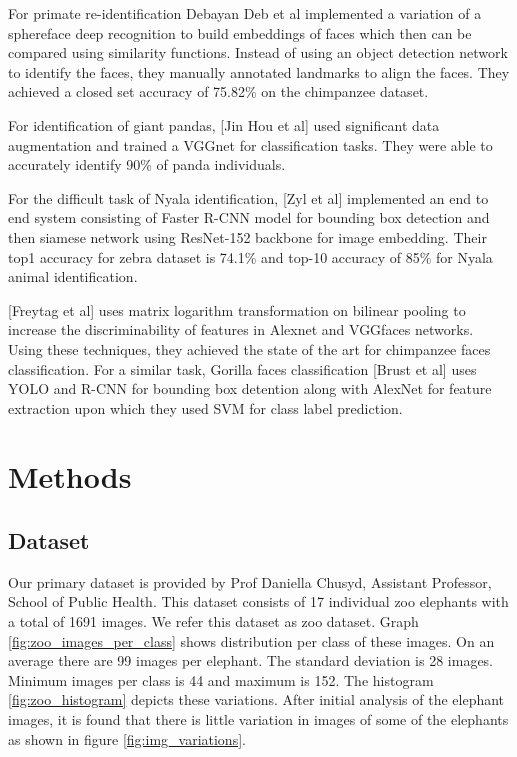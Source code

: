 \documentclass[10pt,twocolumn,letterpaper]{article}
\begin{document}
For primate re-identification Debayan Deb et al \cite{Deb} implemented a variation of a sphereface deep recognition to build embeddings of faces which then can be compared using similarity functions. Instead of using an object detection network to identify the faces, they manually annotated landmarks to align the faces. They achieved a closed set accuracy of 75.82\% on the chimpanzee dataset.

For identification of giant pandas, [Jin Hou et al] \cite{Hou} used significant data augmentation and trained a VGGnet for classification tasks. They were able to accurately identify 90\% of panda individuals.

For the difficult task of Nyala identification, [Zyl et al] implemented an end to end system consisting of Faster R-CNN model for bounding box detection and then siamese network using ResNet-152 backbone for image embedding. Their top1 accuracy for zebra dataset is 74.1\% and top-10 accuracy of 85\% for Nyala animal identification.

[Freytag et al] uses matrix logarithm transformation on bilinear pooling to increase the discriminability of features in Alexnet and VGGfaces networks. Using these techniques, they achieved the state of the art for chimpanzee faces classification. For a similar task, Gorilla faces classification [Brust et al] uses YOLO and R-CNN for bounding box detention along with AlexNet for feature extraction upon which they used SVM for class label prediction.



\section{Methods}
\label{sec:methods}

\subsection{Dataset}
Our primary dataset is provided by Prof Daniella Chusyd, Assistant Professor, School of Public Health. This dataset consists of 17 individual zoo elephants with a total of 1691 images. We refer this dataset as zoo dataset. Graph \ref{fig:zoo_images_per_class} shows distribution per class of these images. On an average there are 99 images per elephant. The standard deviation is 28 images. Minimum images per class is 44 and maximum is 152. The histogram \ref{fig:zoo_histogram} depicts these variations. After initial analysis of the elephant images, it is found that there is little variation in images of some of the elephants as shown in figure \ref{fig:img_variations}.
\end{document}

